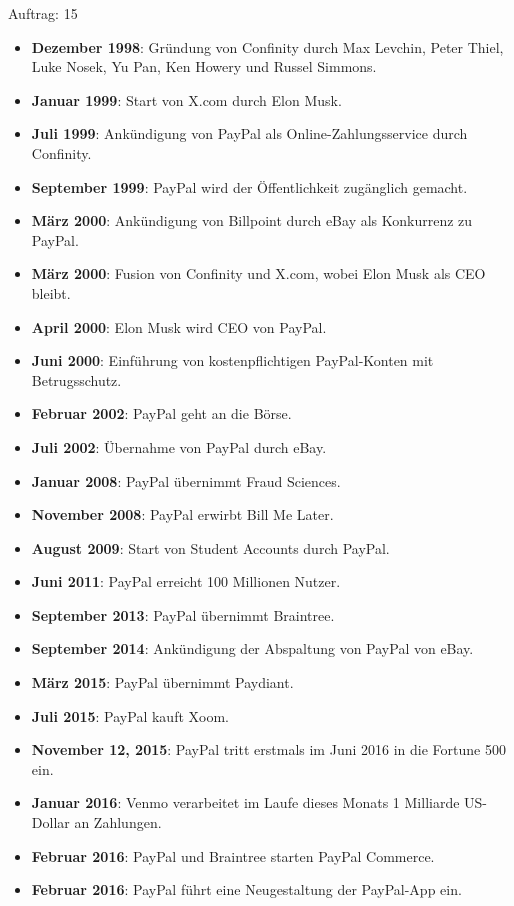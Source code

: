 \documentclass[10pt]{article}
\begin{document}
\begin{description}
    \item[Auftrag: 15]
\end{description}


\begin{itemize}[label=\textbullet]
    \item \textbf{Dezember 1998}: Gründung von Confinity durch Max Levchin, Peter Thiel, Luke Nosek, Yu Pan, Ken Howery und Russel Simmons.    
    \item \textbf{Januar 1999}: Start von X.com durch Elon Musk.    
    \item \textbf{Juli 1999}: Ankündigung von PayPal als Online-Zahlungsservice durch Confinity.    
    \item \textbf{September 1999}: PayPal wird der Öffentlichkeit zugänglich gemacht.   
    \item \textbf{März 2000}: Ankündigung von Billpoint durch eBay als Konkurrenz zu PayPal.    
    \item \textbf{März 2000}: Fusion von Confinity und X.com, wobei Elon Musk als CEO bleibt.    
    \item \textbf{April 2000}: Elon Musk wird CEO von PayPal.    
    \item \textbf{Juni 2000}: Einführung von kostenpflichtigen PayPal-Konten mit Betrugsschutz.    
    \item \textbf{Februar 2002}: PayPal geht an die Börse.    
    \item \textbf{Juli 2002}: Übernahme von PayPal durch eBay.    
    \item \textbf{Januar 2008}: PayPal übernimmt Fraud Sciences.    
    \item \textbf{November 2008}: PayPal erwirbt Bill Me Later.    
    \item \textbf{August 2009}: Start von Student Accounts durch PayPal.    
    \item \textbf{Juni 2011}: PayPal erreicht 100 Millionen Nutzer.    
    \item \textbf{September 2013}: PayPal übernimmt Braintree.      
    \item \textbf{September 2014}: Ankündigung der Abspaltung von PayPal von eBay.    
    \item \textbf{März 2015}: PayPal übernimmt Paydiant.    
    \item \textbf{Juli 2015}: PayPal kauft Xoom.    
    \item \textbf{November 12, 2015}: PayPal tritt erstmals im Juni 2016 in die Fortune 500 ein.    
    \item \textbf{Januar 2016}: Venmo verarbeitet im Laufe dieses Monats 1 Milliarde US-Dollar an Zahlungen.    
    \item \textbf{Februar 2016}: PayPal und Braintree starten PayPal Commerce.    
    \item \textbf{Februar 2016}: PayPal führt eine Neugestaltung der PayPal-App ein.    

\end{itemize}
\end{document}
